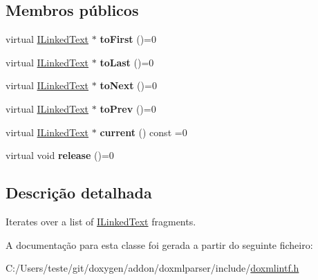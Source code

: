 \subsection*{Membros públicos}
\begin{DoxyCompactItemize}
\item 
\hypertarget{class_i_linked_text_iterator_a0e236964be1832fee7aa88017918682e}{virtual \hyperlink{class_i_linked_text}{I\-Linked\-Text} $\ast$ {\bfseries to\-First} ()=0}\label{class_i_linked_text_iterator_a0e236964be1832fee7aa88017918682e}

\item 
\hypertarget{class_i_linked_text_iterator_a0b487b536ac4b7ea1714486bf7267e81}{virtual \hyperlink{class_i_linked_text}{I\-Linked\-Text} $\ast$ {\bfseries to\-Last} ()=0}\label{class_i_linked_text_iterator_a0b487b536ac4b7ea1714486bf7267e81}

\item 
\hypertarget{class_i_linked_text_iterator_ac842016483f56f955311466610dbc251}{virtual \hyperlink{class_i_linked_text}{I\-Linked\-Text} $\ast$ {\bfseries to\-Next} ()=0}\label{class_i_linked_text_iterator_ac842016483f56f955311466610dbc251}

\item 
\hypertarget{class_i_linked_text_iterator_a4d610a4d8674cb6d157fb85edd34919b}{virtual \hyperlink{class_i_linked_text}{I\-Linked\-Text} $\ast$ {\bfseries to\-Prev} ()=0}\label{class_i_linked_text_iterator_a4d610a4d8674cb6d157fb85edd34919b}

\item 
\hypertarget{class_i_linked_text_iterator_a20526ebb543a8ee2d0f5ca3ad7ab6096}{virtual \hyperlink{class_i_linked_text}{I\-Linked\-Text} $\ast$ {\bfseries current} () const =0}\label{class_i_linked_text_iterator_a20526ebb543a8ee2d0f5ca3ad7ab6096}

\item 
\hypertarget{class_i_linked_text_iterator_aab0a52fdd148a54108e7bf49287d7c47}{virtual void {\bfseries release} ()=0}\label{class_i_linked_text_iterator_aab0a52fdd148a54108e7bf49287d7c47}

\end{DoxyCompactItemize}


\subsection{Descrição detalhada}
Iterates over a list of \hyperlink{class_i_linked_text}{I\-Linked\-Text} fragments. 

A documentação para esta classe foi gerada a partir do seguinte ficheiro\-:\begin{DoxyCompactItemize}
\item 
C\-:/\-Users/teste/git/doxygen/addon/doxmlparser/include/\hyperlink{include_2doxmlintf_8h}{doxmlintf.\-h}\end{DoxyCompactItemize}
